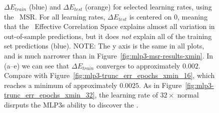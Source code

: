 \begin{figure}[t]
{        \label{fig:mlp3-trunc_err_epochs_detX_8}
    }
    \caption{
        $\Delta E_{train}$ (blue) and $\Delta E_{test}$ (orange) for selected learning rates, using the \TRACELOG~MSR. 
        For all learning rates, $\Delta E_{test}$ is centered on $0$, meaning that the \TRACELOG~Effective Correlation 
        Space explains almost all variation in out-of-sample predictions, but it does \emph{not} explain all of the 
        training set predictions (blue). NOTE: The y axis is the same in all plots, and is much narrower than in 
        Figure~\ref{fig:mlp3-msr-results-xmin}. In (a--e) we can see that $\Delta E_{train}$ converges to approximately 
        $0.002$. Compare with Figure~\ref{fig:mlp3-trunc_err_epochs_xmin_16}, which reaches a minimum of approximately 
        $0.0025$. As in Figure~\ref{fig:mlp3-trunc_err_epochs_xmin_32}, the learning rate of $32\times$ normal disrputs the 
        MLP3s ability to discover the \TRACELOG \EffectiveCorrelationSpace.
    }
    \label{fig:mlp3-msr-results-detX}
\end{figure}


